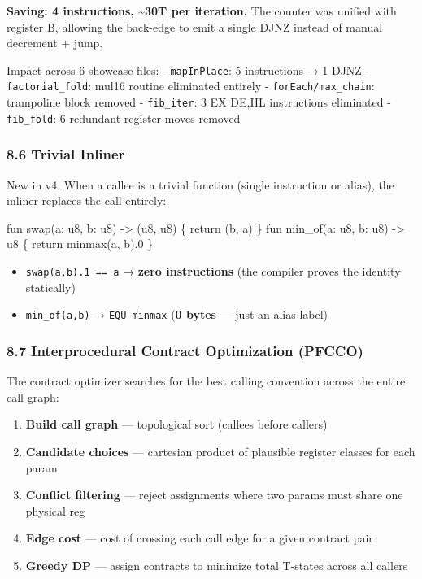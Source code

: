 \documentclass[
  11pt,
]{article}
\newenvironment{Shaded}{}{}
\newcommand{\NormalTok}[1]{#1}
\providecommand{\tightlist}{%
  \setlength{\itemsep}{0pt}\setlength{\parskip}{0pt}}
\begin{document}
\textbf{Saving: 4 instructions, \textasciitilde30T per iteration.} The
counter was unified with register B, allowing the back-edge to emit a
single DJNZ instead of manual decrement + jump.

Impact across 6 showcase files: - \texttt{mapInPlace}: 5 instructions →
1 DJNZ - \texttt{factorial\_fold}: mul16 routine eliminated entirely -
\texttt{forEach/max\_chain}: trampoline block removed -
\texttt{fib\_iter}: 3 EX DE,HL instructions eliminated -
\texttt{fib\_fold}: 6 redundant register moves removed

\subsubsection{8.6 Trivial Inliner}\label{trivial-inliner}

New in v4. When a callee is a trivial function (single instruction or
alias), the inliner replaces the call entirely:

\begin{Shaded}
\begin{Highlighting}[]
\NormalTok{fun swap(a: u8, b: u8) {-}\textgreater{} (u8, u8) \{ return (b, a) \}}
\NormalTok{fun min\_of(a: u8, b: u8) {-}\textgreater{} u8 \{ return minmax(a, b).0 \}}
\end{Highlighting}
\end{Shaded}

\begin{itemize}
\tightlist
\item
  \texttt{swap(a,b).1\ ==\ a} → \textbf{zero instructions} (the compiler
  proves the identity statically)
\item
  \texttt{min\_of(a,b)} → \texttt{EQU\ minmax} (\textbf{0 bytes} ---
  just an alias label)
\end{itemize}

\subsubsection{8.7 Interprocedural Contract Optimization
(PFCCO)}\label{interprocedural-contract-optimization-pfcco}

The contract optimizer searches for the best calling convention across
the entire call graph:

\begin{enumerate}
\def\labelenumi{\arabic{enumi}.}
\tightlist
\item
  \textbf{Build call graph} --- topological sort (callees before
  callers)
\item
  \textbf{Candidate choices} --- cartesian product of plausible register
  classes for each param
\item
  \textbf{Conflict filtering} --- reject assignments where two params
  must share one physical reg
\item
  \textbf{Edge cost} --- cost of crossing each call edge for a given
  contract pair
\item
  \textbf{Greedy DP} --- assign contracts to minimize total T-states
  across all callers
\end{enumerate}
\end{document}
